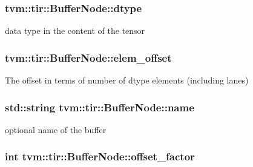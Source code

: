 \subsubsection[{\texorpdfstring{dtype}{dtype}}]{ tvm\+::tir\+::\+Buffer\+Node\+::dtype}\hypertarget{classtvm_1_1tir_1_1BufferNode_acf0d9633c7c746acb419f09a687bcc77}{}\label{classtvm_1_1tir_1_1BufferNode_acf0d9633c7c746acb419f09a687bcc77}


data type in the content of the tensor 

\subsubsection[{\texorpdfstring{elem\+\_\+offset}{elem_offset}}]{ tvm\+::tir\+::\+Buffer\+Node\+::elem\+\_\+offset}\hypertarget{classtvm_1_1tir_1_1BufferNode_a92b84a76c975399a028b61e4b99ac87b}{}\label{classtvm_1_1tir_1_1BufferNode_a92b84a76c975399a028b61e4b99ac87b}


The offset in terms of number of dtype elements (including lanes) 

\subsubsection[{\texorpdfstring{name}{name}}]{\setlength{\rightskip}{0pt plus 5cm}std\+::string tvm\+::tir\+::\+Buffer\+Node\+::name}\hypertarget{classtvm_1_1tir_1_1BufferNode_a338ae208f36a89b87e4bb51c8e8f2b10}{}\label{classtvm_1_1tir_1_1BufferNode_a338ae208f36a89b87e4bb51c8e8f2b10}


optional name of the buffer 

\subsubsection[{\texorpdfstring{offset\+\_\+factor}{offset_factor}}]{\setlength{\rightskip}{0pt plus 5cm}int tvm\+::tir\+::\+Buffer\+Node\+::offset\+\_\+factor}\hypertarget{classtvm_1_1tir_1_1BufferNode_aa89852936d3a026cea1470c4c7f27488}{}\label{classtvm_1_1tir_1_1BufferNode_aa89852936d3a026cea1470c4c7f27488}


